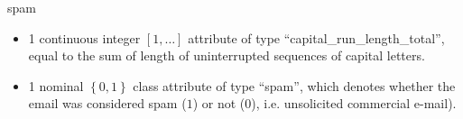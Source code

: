 \begin{dataSetDescription}{spam}
{\begin{itemize}
                longest uninterrupted sequence of capital letters.
            \item 1 continuous integer \ensuremath{\left[1,\ldots\right]} attribute of
                type ``capital\_run\_length\_total'', equal to the sum of length
                of uninterrupted sequences of capital letters.
            \item 1 nominal \ensuremath{\left\{0,1\right\}} class attribute of type
                ``spam'', which denotes whether the email was considered spam
                (\ensuremath{1}) or not (\ensuremath{0}), i.e. unsolicited commercial e-mail).
        \end{itemize}
    }
\end{dataSetDescription}

